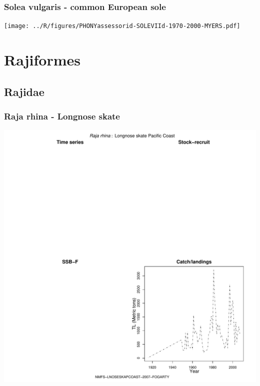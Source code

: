 \subsubsection{Solea vulgaris - common European sole}
\begin{center}
\texttt{[image: ../R/figures/PHONYassessorid-SOLEVIId-1970-2000-MYERS.pdf]}
\end{center}

\section{Rajiformes}

\subsection{Rajidae}

\subsubsection{Raja rhina - Longnose skate}
\begin{center}
\includegraphics[width=1.2\textwidth]{../R/figures/NMFS-LNOSESKAPCOAST-2007-FOGARTY.pdf}
\end{center}

